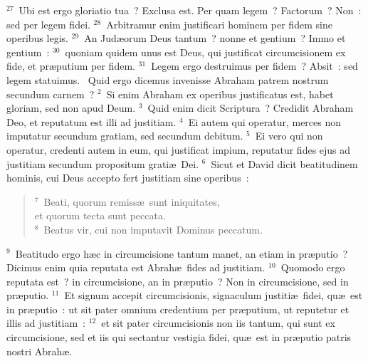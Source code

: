 ${}^{27}$~Ubi est ergo gloriatio tua~? Exclusa est. Per quam legem~? Factorum~? Non~: sed per legem fidei.
${}^{28}$~Arbitramur enim justificari hominem per fidem sine operibus legis.
${}^{29}$~An Jud\ae orum Deus tantum~? nonne et gentium~? Immo et gentium~:
${}^{30}$~quoniam quidem unus est Deus, qui justificat circumcisionem ex fide, et pr\ae putium per fidem.
${}^{31}$~Legem ergo destruimus per fidem~? Absit~: sed legem statuimus.
~Quid ergo dicemus invenisse Abraham patrem nostrum secundum carnem~?
${}^{2}$~Si enim Abraham ex operibus justificatus est, habet gloriam, sed non apud Deum.
${}^{3}$~Quid enim dicit Scriptura~? Credidit Abraham Deo, et reputatum est illi ad justitiam.
${}^{4}$~Ei autem qui operatur, merces non imputatur secundum gratiam, sed secundum debitum.
${}^{5}$~Ei vero qui non operatur, credenti autem in eum, qui justificat impium, reputatur fides ejus ad justitiam secundum propositum grati\ae\ Dei.
${}^{6}$~Sicut et David dicit beatitudinem hominis, cui Deus accepto fert justitiam sine operibus~:
\begin{flushleft}\begin{verse}${}^{7}$~Beati, quorum remiss\ae\ sunt iniquitates,\\ et quorum tecta sunt peccata.\\
${}^{8}$~Beatus vir, cui non imputavit Dominus peccatum.\end{verse}\end{flushleft}


${}^{9}$~Beatitudo ergo h\ae c in circumcisione tantum manet, an etiam in pr\ae putio~? Dicimus enim quia reputata est Abrah\ae\ fides ad justitiam.
${}^{10}$~Quomodo ergo reputata est~? in circumcisione, an in pr\ae putio~? Non in circumcisione, sed in pr\ae putio.
${}^{11}$~Et signum accepit circumcisionis, signaculum justiti\ae\ fidei, qu\ae\ est in pr\ae putio~: ut sit pater omnium credentium per pr\ae putium, ut reputetur et illis ad justitiam~:
${}^{12}$~et sit pater circumcisionis non iis tantum, qui sunt ex circumcisione, sed et iis qui sectantur vestigia fidei, qu\ae\ est in pr\ae putio patris nostri Abrah\ae .


